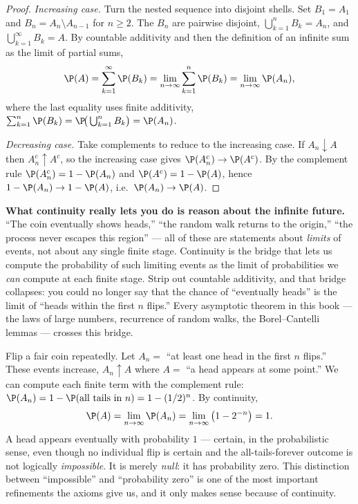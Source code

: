 \begin{proof}
\emph{Increasing case.} Turn the nested sequence into disjoint shells. Set
$B_1 = A_1$ and $B_n = A_n \setminus A_{n-1}$ for $n \ge 2$. The $B_n$ are
pairwise disjoint, $\bigcup_{k=1}^n B_k = A_n$, and $\bigcup_{k=1}^\infty B_k =
A$. By countable additivity and then the definition of an infinite sum as the
limit of partial sums,
\[
\P(A) = \sum_{k=1}^{\infty} \P(B_k) = \lim_{n\to\infty} \sum_{k=1}^{n} \P(B_k)
= \lim_{n\to\infty} \P(A_n),
\]
where the last equality uses finite additivity, $\sum_{k=1}^n \P(B_k) =
\P\!\big(\bigcup_{k=1}^n B_k\big) = \P(A_n)$.

\emph{Decreasing case.} Take complements to reduce to the increasing case. If
$A_n \downarrow A$ then $A_n^c \uparrow A^c$, so the increasing case gives
$\P(A_n^c) \to \P(A^c)$. By the complement rule $\P(A_n^c) = 1 - \P(A_n)$ and
$\P(A^c) = 1 - \P(A)$, hence $1 - \P(A_n) \to 1 - \P(A)$, i.e.\
$\P(A_n) \to \P(A)$.
\end{proof}

\begin{happeningbox}
\textbf{What continuity really lets you do is reason about the infinite future.}
``The coin eventually shows heads,'' ``the random walk returns to the origin,''
``the process never escapes this region'' --- all of these are statements about
\emph{limits} of events, not about any single finite stage. Continuity is the
bridge that lets us compute the probability of such limiting events as the limit
of probabilities we \emph{can} compute at each finite stage. Strip out countable
additivity, and that bridge collapses: you could no longer say that the chance of
``eventually heads'' is the limit of ``heads within the first $n$ flips.'' Every
asymptotic theorem in this book --- the laws of large numbers, recurrence of
random walks, the Borel--Cantelli lemmas --- crosses this bridge.
\end{happeningbox}

\begin{example}
\label{ch03:ex-eventually}
Flip a fair coin repeatedly. Let $A_n = $ ``at least one head in the first $n$
flips.'' These events increase, $A_n \uparrow A$ where $A = $ ``a head appears at
some point.'' We can compute each finite term with the complement rule:
$\P(A_n) = 1 - \P(\text{all tails in } n) = 1 - (1/2)^n$. By continuity,
\[
\P(A) = \lim_{n \to \infty} \P(A_n) = \lim_{n\to\infty}\big(1 - 2^{-n}\big) = 1.
\]
A head appears eventually with probability $1$ --- certain, in the
probabilistic sense, even though no individual flip is certain and the
all-tails-forever outcome is not logically \emph{impossible}. It is merely
\emph{null}: it has probability zero. This distinction between ``impossible'' and
``probability zero'' is one of the most important refinements the axioms give
us, and it only makes sense because of continuity.
\end{example}

